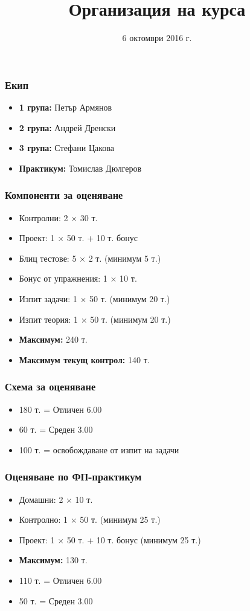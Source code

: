 \documentclass{beamer}
\title{Организация на курса}
\date{6 октомври 2016 г.}
\begin{document}
\begin{frame}
  \titlepage
\end{frame}

\begin{frame}
  \frametitle{Екип}

  \begin{itemize}
  \item \textbf{1 група:} Петър Армянов
  \item \textbf{2 група:} Андрей Дренски
  \item \textbf{3 група:} Стефани Цакова
  \item \textbf{Практикум:} Томислав Дюлгеров
  \end{itemize}
\end{frame}

\begin{frame}
  \frametitle{Компоненти за оценяване}

  \begin{itemize}
  \item Контролни: 2 $\times$ 30 т.
  \item Проект: 1 $\times$ 50 т. + 10 т. бонус
  \item Блиц тестове: 5 $\times$ 2 т. \alert{(минимум 5 т.)}
  \item Бонус от упражнения: 1 $\times$ 10 т.
  \item Изпит задачи: 1 $\times$ 50 т. \alert{(минимум 20 т.)}
  \item Изпит теория: 1 $\times$ 50 т. \alert{(минимум 20 т.)}
  \item \textbf{Максимум:} 240 т.
  \item \textbf{Максимум текущ контрол:} 140 т.
  \end{itemize}
\end{frame}

\begin{frame}
  \frametitle{Схема за оценяване}

  \begin{itemize}
  \item 180 т. = Отличен 6.00
  \item 60 т. = Среден 3.00
  \item 100 т. = освобождаване от изпит на задачи
  \end{itemize}
\end{frame}

\begin{frame}
  \frametitle{Оценяване по ФП-практикум}

  \begin{itemize}
  \item Домашни: 2 $\times$ 10 т.
  \item Контролно: 1 $\times$ 50 т. \alert{(минимум 25 т.)}
  \item Проект: 1 $\times$ 50 т. + 10 т. бонус \alert{(минимум 25 т.)}
  \item \textbf{Максимум:} 130 т.
  \item 110 т. = Отличен 6.00
  \item 50 т. = Среден 3.00
  \end{itemize}
\end{frame}
\end{document}
